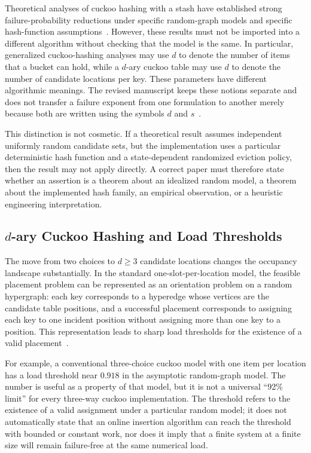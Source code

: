 \documentclass[conference]{IEEEtran}
\begin{document}
Theoretical analyses of cuckoo hashing with a stash have established strong failure-probability reductions under specific random-graph models and specific hash-function assumptions~\cite{kirsch2009stash,kutzelnigg2010stash,aumuller2014explicit,noble2021explicit}. However, these results must not be imported into a different algorithm without checking that the model is the same. In particular, generalized cuckoo-hashing analyses may use $d$ to denote the number of items that a bucket can hold, while a $d$-ary cuckoo table may use $d$ to denote the number of candidate locations per key. These parameters have different algorithmic meanings. The revised manuscript keeps these notions separate and does not transfer a failure exponent from one formulation to another merely because both are written using the symbols $d$ and $s$~\cite{minaud2023generalized}.

This distinction is not cosmetic. If a theoretical result assumes independent uniformly random candidate sets, but the implementation uses a particular deterministic hash function and a state-dependent randomized eviction policy, then the result may not apply directly. A correct paper must therefore state whether an assertion is a theorem about an idealized random model, a theorem about the implemented hash family, an empirical observation, or a heuristic engineering interpretation.

\subsection{$d$-ary Cuckoo Hashing and Load Thresholds}

The move from two choices to $d\geq3$ candidate locations changes the occupancy landscape substantially. In the standard one-slot-per-location model, the feasible placement problem can be represented as an orientation problem on a random hypergraph: each key corresponds to a hyperedge whose vertices are the candidate table positions, and a successful placement corresponds to assigning each key to one incident position without assigning more than one key to a position. This representation leads to sharp load thresholds for the existence of a valid placement~\cite{fountoulakis2012sharp,dietzfelbinger2009tight}.

For example, a conventional three-choice cuckoo model with one item per location has a load threshold near $0.918$ in the asymptotic random-graph model. The number is useful as a property of that model, but it is not a universal ``92\% limit'' for every three-way cuckoo implementation. The threshold refers to the existence of a valid assignment under a particular random model; it does not automatically state that an online insertion algorithm can reach the threshold with bounded or constant work, nor does it imply that a finite system at a finite size will remain failure-free at the same numerical load.
\end{document}
